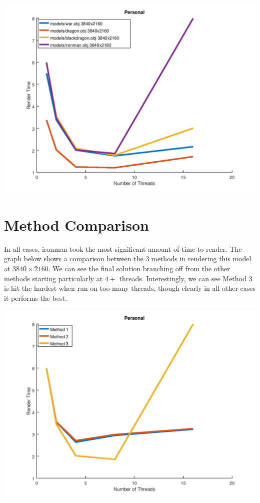 \documentclass[12pt]{article}
\begin{document}
\begin{center}
	\includegraphics[scale=0.5]{parallel2_personal.png}
\end{center}

\section*{Method Comparison}

In all cases, ironman took the most significant amount of time to render. The graph below
shows a comparison between the 3 methods in rendering this model at $3840\times2160$. We can see
the final solution branching off from the other methods starting particularly at $4+$ threads.
Interestingly, we can see Method 3 is hit the hardest when run on too many threads, though clearly
in all other cases it performs the best.

\begin{center}
	\includegraphics[scale=0.5]{parallel3_personal.png}
\end{center}
\end{document}

